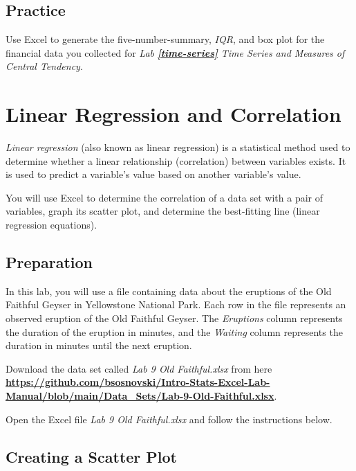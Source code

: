 \documentclass[
]{book}
\begin{document}
\hypertarget{practice-6}{%
\section{Practice}\label{practice-6}}

Use Excel to generate the five-number-summary, \emph{IQR}, and box plot for the financial data you collected for \emph{Lab} \textbf{\emph{\ref{time-series}}} \emph{Time Series and Measures of Central Tendency}.

\hypertarget{linear-regression-and-correlation}{%
\chapter{Linear Regression and Correlation}\label{linear-regression-and-correlation}}

\emph{Linear regression} (also known as linear regression) is a statistical method used to determine whether a linear relationship (correlation) between variables exists. It is used to predict a variable's value based on another variable's value.

You will use Excel to determine the correlation of a data set with a pair of variables, graph its scatter plot, and determine the best-fitting line (linear regression equations).

\hypertarget{preparation-6}{%
\section{Preparation}\label{preparation-6}}

In this lab, you will use a file containing data about the eruptions of the Old Faithful Geyser in Yellowstone National Park. Each row in the file represents an observed eruption of the Old Faithful Geyser. The \emph{Eruptions} column represents the duration of the eruption in minutes, and the \emph{Waiting} column represents the duration in minutes until the next eruption.

Download the data set called \emph{Lab 9 Old Faithful.xlsx} from here \href{https://github.com/bsosnovski/Intro-Stats-Excel-Lab-Manual/blob/main/Data_Sets/Lab-9-Old-Faithful.xlsx}{\textbf{https://github.com/bsosnovski/Intro-Stats-Excel-Lab-Manual/blob/main/Data\_Sets/Lab-9-Old-Faithful.xlsx}}.

Open the Excel file \emph{Lab 9 Old Faithful.xlsx} and follow the instructions below.

\hypertarget{create-scatter-plot}{%
\section{Creating a Scatter Plot}\label{create-scatter-plot}}
\end{document}
